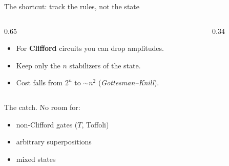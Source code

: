\documentclass[aspectratio=169]{beamer}
\begin{document}
\begin{frame}{The shortcut: track the rules, not the state}
  \begin{columns}[c]
    \begin{column}{0.65\textwidth}
      \begin{itemize}
        \item For \textbf{Clifford} circuits you can drop amplitudes.
        \item Keep only the $n$ stabilizers of the state.
        \item Cost falls from $2^n$ to $\sim n^2$ (\emph{Gottesman--Knill}).
      \end{itemize}
    \end{column}
    \begin{column}{0.34\textwidth}
      \centering
    \end{column}
  \end{columns}
  \vfill
  \alert{The catch.} No room for:
  \begin{itemize}
    \item non-Clifford gates ($T$, Toffoli)
    \item arbitrary superpositions
    \item mixed states
  \end{itemize}
\end{frame}
\end{document}
